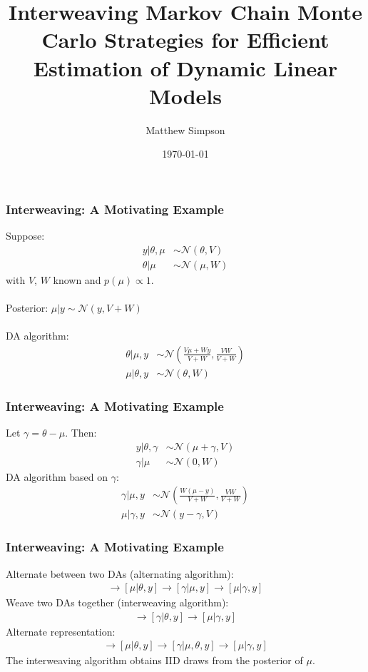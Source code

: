 \documentclass[xcolor=dvipsnames]{beamer}
\title[Interweaving MCMC Strats for DLMs]{Interweaving Markov Chain Monte Carlo Strategies for Efficient
Estimation of Dynamic Linear Models}
\author[M. Simpson]{Matthew Simpson}
\date{\today}
\institute[Deps of Stat \& Econ, ISU]{Departments of Statistics and Economics, Iowa State University}
\newcommand\N{\mathcal{N}}
\begin{document}
\begin{frame}
\titlepage
\end{frame}

\begin{frame}
\frametitle{Interweaving: A Motivating Example}
Suppose:
\begin{align*}
y|\theta, \mu & \sim \N(\theta, V) \\
\theta|\mu & \sim \N(\mu, W) 
\end{align*}
with $V$, $W$ known and $p(\mu)\propto 1$.\\~\\
Posterior: $\mu|y \sim \N(y, V+W)$\\~\\
DA algorithm:
\begin{align*}
\theta|\mu,y &\sim \N\left(\frac{V\mu + Wy}{V+W}, \frac{VW}{V+W}\right)\\
\mu |\theta, y &\sim \N(\theta, W)
\end{align*}
\end{frame}

\begin{frame}
\frametitle{Interweaving: A Motivating Example}
Let $\gamma = \theta - \mu$. Then:
\begin{align*}
y|\theta, \gamma & \sim \N(\mu + \gamma, V) \\
\gamma|\mu & \sim \N(0, W) 
\end{align*}
DA algorithm based on $\gamma$:
\begin{align*}
\gamma|\mu,y &\sim \N\left(\frac{W(\mu - y)}{V+W}, \frac{VW}{V+W}\right)\\
\mu |\gamma, y &\sim \N(y-\gamma, V)
\end{align*}
\end{frame}

\begin{frame}
\frametitle{Interweaving: A Motivating Example}
Alternate between two DAs (alternating algorithm):
\begin{align*}
[\theta|\mu,y] \to [\mu|\theta,y] \to [\gamma|\mu,y] \to [\mu|\gamma,y]
\end{align*}
Weave two DAs together (interweaving algorithm):
\begin{align*}
[\theta|\mu,y] \to [\gamma|\theta,y] \to [\mu|\gamma,y]
\end{align*}
Alternate representation:
\begin{align*}
[\theta|\mu,y] \to [\mu|\theta,y] \to [\gamma|\mu,\theta,y] \to [\mu|\gamma,y]
\end{align*}
{\color{blue}The interweaving algorithm obtains IID draws from the posterior of $\mu$.}
\end{frame}
\end{document}
